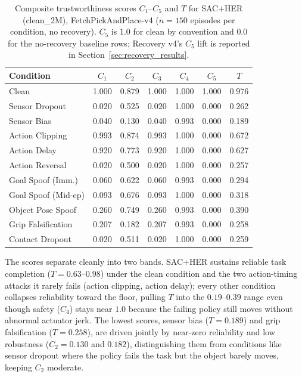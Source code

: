 \documentclass[conference]{IEEEtran}
\begin{document}
\begin{table}[t]
\centering
\caption{Composite trustworthiness scores $C_1$--$C_5$ and $T$ for SAC+HER (clean\_2M),
FetchPickAndPlace-v4 ($n=150$ episodes per condition, no recovery). $C_5$ is $1.0$ for
clean by convention and $0.0$ for the no-recovery baseline rows; Recovery v4's $C_5$ lift
is reported in Section~\ref{sec:recovery_results}.}
\label{tab:composite_scores}
\begin{tabular}{lcccccc}
\toprule
Condition & $C_1$ & $C_2$ & $C_3$ & $C_4$ & $C_5$ & $T$ \\
\midrule
Clean                 & 1.000 & 0.879 & 1.000 & 1.000 & 1.000 & 0.976 \\
Sensor Dropout        & 0.020 & 0.525 & 0.020 & 1.000 & 0.000 & 0.262 \\
Sensor Bias           & 0.040 & 0.130 & 0.040 & 0.993 & 0.000 & 0.189 \\
Action Clipping       & 0.993 & 0.874 & 0.993 & 1.000 & 0.000 & 0.672 \\
Action Delay          & 0.920 & 0.773 & 0.920 & 1.000 & 0.000 & 0.627 \\
Action Reversal       & 0.020 & 0.500 & 0.020 & 1.000 & 0.000 & 0.257 \\
Goal Spoof (Imm.)     & 0.060 & 0.622 & 0.060 & 0.993 & 0.000 & 0.294 \\
Goal Spoof (Mid-ep)   & 0.093 & 0.676 & 0.093 & 1.000 & 0.000 & 0.318 \\
Object Pose Spoof     & 0.260 & 0.749 & 0.260 & 0.993 & 0.000 & 0.390 \\
Grip Falsification    & 0.207 & 0.182 & 0.207 & 0.993 & 0.000 & 0.258 \\
Contact Dropout       & 0.020 & 0.511 & 0.020 & 1.000 & 0.000 & 0.259 \\
\bottomrule
\end{tabular}
\end{table}

The scores separate cleanly into two bands. SAC+HER sustains reliable task completion
($T = 0.63$--$0.98$) under the clean condition and the two action-timing attacks it
rarely fails (action clipping, action delay); every other condition collapses
reliability toward the floor, pulling $T$ into the $0.19$--$0.39$ range even though
safety ($C_4$) stays near $1.0$ because the failing policy still moves without abnormal
actuator jerk. The lowest scores, sensor bias ($T=0.189$) and grip falsification
($T=0.258$), are driven jointly by near-zero reliability and low robustness ($C_2=0.130$
and $0.182$), distinguishing them from conditions like sensor dropout where the policy
fails the task but the object barely moves, keeping $C_2$ moderate.
\end{document}
